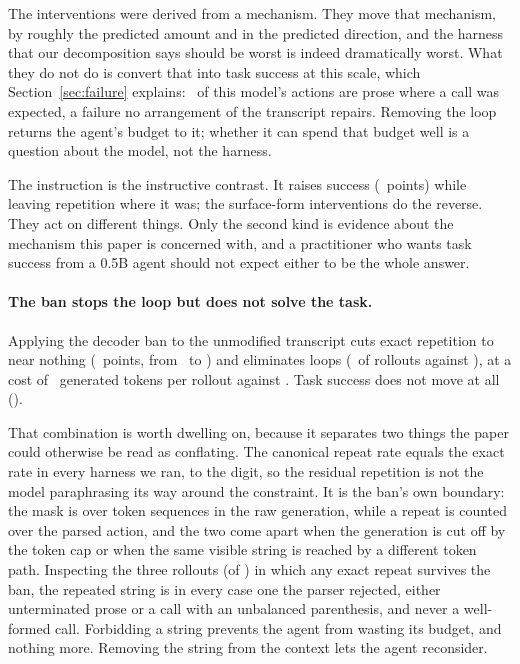 The interventions were derived from a mechanism. They move that mechanism, by
roughly the predicted amount and in the predicted direction, and the harness
that our decomposition says should be worst is indeed dramatically worst. What they do not do is convert that into task success at this scale, which
Section~\ref{sec:failure} explains: \ProseShare\ of this model's actions are
prose where a call was expected, a failure no arrangement of the transcript
repairs. Removing the loop returns the agent's budget to it; whether it can
spend that budget well is a question about the model, not the harness.

The instruction is the instructive contrast. It raises success
(\DeltaInstrSuccess\ points) while leaving repetition where it was; the
surface-form interventions do the reverse. They act on different things. Only
the second kind is evidence about the mechanism this paper is concerned with,
and a practitioner who wants task success from a 0.5B agent should not expect
either to be the whole answer.

\paragraph{The ban stops the loop but does not solve the task.}
Applying the decoder ban to the unmodified transcript cuts exact repetition to
near nothing (\DeltaVerbBanRepeat\ points, from \AgentVerbatimRepeat\ to
\AgentVerbBanRepeat) and eliminates loops
(\AgentVerbBanStuck\ of rollouts against \AgentVerbatimStuck), at a cost of
\AgentVerbBanTokens\ generated tokens per rollout against
\AgentVerbatimTokens. Task success does not move at all
(\DeltaVerbBanSuccess).

That combination is worth dwelling on, because it separates two things the
paper could otherwise be read as conflating. The canonical repeat rate equals
the exact rate in every harness we ran, to the digit, so the residual
repetition is not the model paraphrasing its way around the constraint. It is
the ban's own boundary: the mask is over token sequences in the raw generation,
while a repeat is counted over the parsed action, and the two come apart when
the generation is cut off by the token cap or when the same visible string is
reached by a different token path. Inspecting the three rollouts (of
\AgentNumTasks) in which any exact repeat survives the ban, the repeated string is in every case one the parser rejected, either
unterminated prose or a call with an unbalanced parenthesis, and never a
well-formed call. Forbidding a string
prevents the agent from wasting its budget, and nothing more. Removing the
string from the context lets the agent reconsider.

